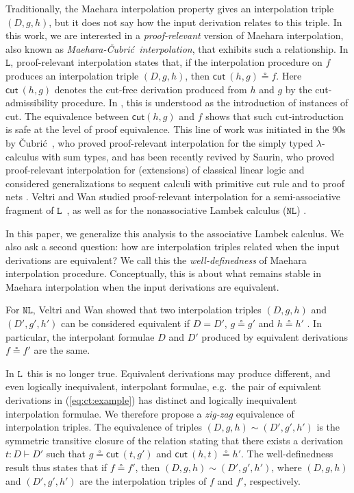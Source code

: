 \documentclass[a4paper,UKenglish,cleveref,autoref,thm-restate, anonymous]{lipics-v2021}
\newcommand{\mf}[1]{\mathsf{#1}}
\renewcommand{\L}{$\mathtt{L}$}
\newcommand{\NL}{$\mathtt{NL}$}
\newcommand{\vd}{\vdash}
\newcommand{\cut}{\mf{cut}}
\newcommand{\cub}{\v{C}ubri{\'c}}
\begin{document}
Traditionally, the Maehara interpolation property gives an interpolation triple $(D,g,h)$, but it does not say how the input derivation relates to this triple.
In this work, we are interested in a \emph{proof-relevant} version of Maehara interpolation, also known as \emph{Maehara-\cub\ interpolation}, that exhibits such a relationship.
In \L, proof-relevant interpolation states that, if the interpolation procedure on $f$ produces an interpolation triple $(D,g,h)$, then $\cut \ (h , g) \circeq f$.
Here $\cut \ (h,g)$ denotes the cut-free derivation produced from $h$ and $g$ by the cut-admissibility procedure.
In \cite{Saurin2024}, this is understood as the introduction of instances of cut.
The equivalence between $\cut (h , g)$ and $f$ shows that such cut-introduction is safe at the level of proof equivalence.
This line of work was initiated in the 90s by \cub~\cite{vcubric1993results,Cubric1994}, who proved proof-relevant interpolation for the simply typed $\lambda$-calculus with sum types,
and has been recently revived by Saurin, who proved proof-relevant interpolation for (extensions) of classical linear logic \cite{Saurin2024} and considered generalizations to sequent calculi with primitive cut rule and to proof nets \cite{Saurin2025}.
Veltri and Wan studied proof-relevant interpolation for a semi-associative fragment of \L~\cite{VW2025}, as well as for the nonassociative Lambek calculus (\NL) \cite{VW2025Tableaux}.

In this paper, we generalize this analysis to the associative Lambek calculus.
We also ask a second question: how are interpolation triples related when the input derivations are equivalent?
We call this the \emph{well-definedness} of Maehara interpolation procedure.
Conceptually, this is about what remains stable in Maehara interpolation when the input derivations are equivalent.

For \NL, Veltri and Wan showed that two interpolation triples $(D , g, h)$ and $(D' , g', h')$ can be considered equivalent if $D = D'$, $g \circeq g'$ and $h \circeq h'$ \cite{VW2025Tableaux}. In particular, the interpolant formulae $D$ and $D'$ produced by equivalent derivations $f \circeq f'$ are the same.

In \L\ this is no longer true.
Equivalent derivations may produce different, and even logically inequivalent, interpolant formulae, e.g.\ the pair of equivalent derivations in (\ref{eq:ct:example}) has distinct and logically inequivalent interpolation formulae.
We therefore propose a \emph{zig-zag} equivalence of interpolation triples.
The equivalence of triples $(D , g, h) \sim (D' , g', h')$ is the symmetric transitive closure of the relation stating that there exists a derivation $t : D \vd D'$ such that $g \circeq \cut \ (t , g')$ and $\cut \ (h , t) \circeq h'$.
The well-definedness result thus states that if $f \circeq f'$, then $(D , g, h) \sim (D' , g', h')$, where $(D , g, h)$ and $(D' , g', h')$ are the interpolation triples of $f$ and $f'$, respectively.
\end{document}
